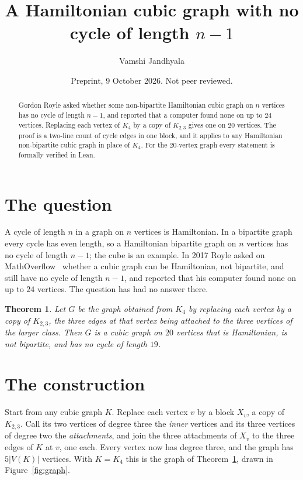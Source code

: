 \documentclass[11pt]{amsart}
\title{A Hamiltonian cubic graph with no cycle of length $n-1$}
\author{Vamshi Jandhyala}
\date{Preprint, 9 October 2026. Not peer reviewed.}
\newtheorem{theorem}{Theorem}
\theoremstyle{remark}
\begin{document}
\begin{abstract}
Gordon Royle asked whether some non-bipartite Hamiltonian cubic graph on $n$ vertices has no cycle of
length $n-1$, and reported that a computer found none on up to $24$ vertices. Replacing each vertex of
$K_4$ by a copy of $K_{2,3}$ gives one on $20$ vertices. The proof is a two-line count of cycle edges
in one block, and it applies to any Hamiltonian non-bipartite cubic graph in place of $K_4$. For the
$20$-vertex graph every statement is formally verified in Lean.
\end{abstract}
\maketitle

\section{The question}

A cycle of length $n$ in a graph on $n$ vertices is Hamiltonian. In a bipartite graph every cycle has
even length, so a Hamiltonian bipartite graph on $n$ vertices has no cycle of length $n-1$; the cube is
an example. In 2017 Royle asked on MathOverflow~\cite{mo} whether a cubic graph can be Hamiltonian,
not bipartite, and still have no cycle of length $n-1$, and reported that his computer found none on up
to $24$ vertices. The question has had no answer there.

\begin{theorem}\label{thm:main}
Let $G$ be the graph obtained from $K_4$ by replacing each vertex by a copy of $K_{2,3}$, the three
edges at that vertex being attached to the three vertices of the larger class. Then $G$ is a cubic
graph on $20$ vertices that is Hamiltonian, is not bipartite, and has no cycle of length $19$.
\end{theorem}

\section{The construction}

Start from any cubic graph $K$. Replace each vertex $v$ by a block $X_v$, a copy of $K_{2,3}$. Call
its two vertices of degree three the \emph{inner} vertices and its three vertices of degree two the
\emph{attachments}, and join the three attachments of $X_v$ to the three edges of $K$ at $v$, one each.
Every vertex now has degree three, and the graph has $5|V(K)|$ vertices. With $K=K_4$ this is the
graph of Theorem~\ref{thm:main}, drawn in Figure~\ref{fig:graph}.
\end{document}
